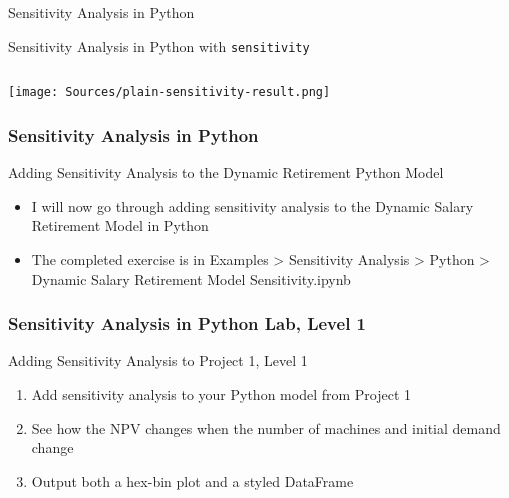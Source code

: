 \documentclass[handout, 11pt]{beamer}
\begin{document}
\begin{section}[SA Python]{Sensitivity Analysis in Python}
\begin{frame}[fragile]
\begin{block}{Sensitivity Analysis in Python with \texttt{sensitivity}}
\begin{verbatim}
\end{verbatim}
\texttt{[image: Sources/plain-sensitivity-result.png]}
\end{block}
\end{frame}
\begin{frame}
\frametitle{Sensitivity Analysis in Python}
{
\begin{block}{Adding Sensitivity Analysis to the Dynamic Retirement Python Model}
\begin{itemize}
\item I will now go through adding sensitivity analysis to the Dynamic Salary Retirement Model in Python
\item The completed exercise is in Examples > Sensitivity Analysis > Python > Dynamic Salary Retirement Model Sensitivity.ipynb
\end{itemize}
\end{block}
}
\end{frame}
\begin{frame}
\frametitle{Sensitivity Analysis in Python Lab, Level 1}
{
\begin{block}{Adding Sensitivity Analysis to Project 1, Level 1}
\begin{enumerate}
\item Add sensitivity analysis to your Python model from Project 1
\item See how the NPV changes when the number of machines and initial demand change
\item Output both a hex-bin plot and a styled DataFrame
\end{enumerate}
\vfill
\end{block}
}
\label{labs:sensitivity:python-1}
\end{frame}
\end{section}
\end{document}
